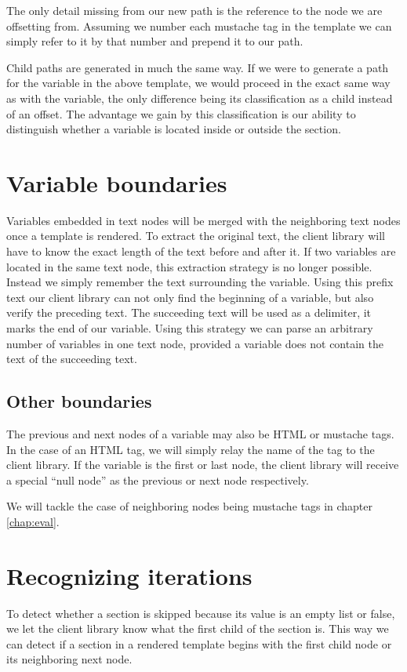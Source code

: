 The only detail missing from our new path is the reference to the node we are
offsetting from. Assuming we number each mustache tag in the template we can
simply refer to it by that number and prepend it to our path.

Child paths are generated in much the same way. If we were to generate a path
for the  variable in the above template, we would
proceed in the exact same way as with the  variable,
the only difference being its classification as a child instead of an offset.
The advantage we gain by this classification is our ability to distinguish
whether a variable is located inside or outside the section.

\section{Variable boundaries}
Variables embedded in text nodes will be merged with the neighboring text nodes
once a template is rendered. To extract the original text, the client library
will have to know the exact length of the text before and after it. If two
variables are located in the same text node, this extraction strategy is no
longer possible. Instead we simply remember the text surrounding the variable.
Using this prefix text our client library can not only find the beginning of a
variable, but also verify the preceding text. The succeeding text will be
used as a delimiter, it marks the end of our variable.
Using this strategy we can parse an arbitrary number of variables in one text
node, provided a variable does not contain the text of the succeeding text.

\subsection{Other boundaries}
The previous and next nodes of a variable may also be HTML or mustache tags.
In the case of an HTML tag, we will simply relay the name of the tag to the
client library. If the variable is the first or last node, the client library
will receive a special ``null node'' as the previous or next node respectively.

We will tackle the case of neighboring nodes being mustache tags in chapter
\ref{chap:eval}.

\section{Recognizing iterations}
To detect whether a section is skipped because its value is an empty
list or false, we let the client library know what the first child of the
section is.
This way we can detect if a section in a rendered template begins with the
first child node or its neighboring next node.

